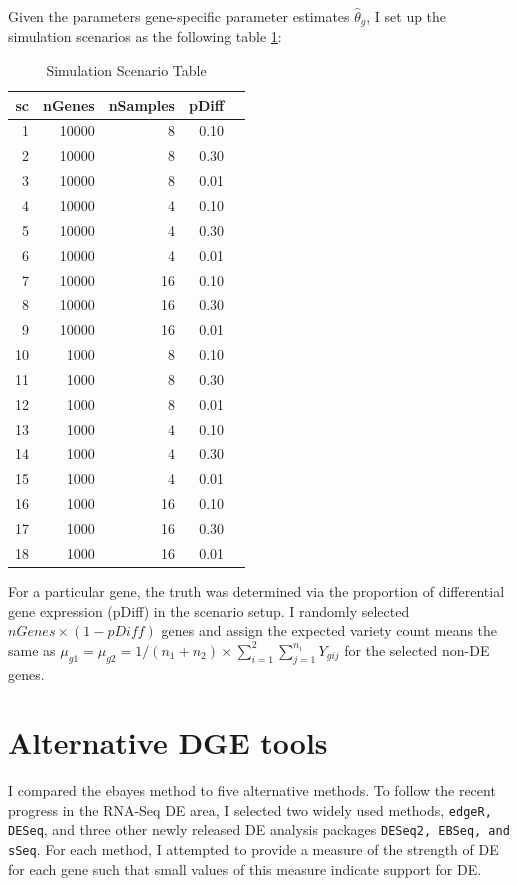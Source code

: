 \documentclass[11pt]{isuthesis}
\begin{document}
Given the parameters gene-specific parameter estimates $\hat{\theta}_g$, I set up the simulation scenarios as the following table \ref{tab:Scenario}:

\begin{table}[H]
\centering
\begin{tabular}{|r|r|r|r|r|}
\hline
sc & nGenes & nSamples & pDiff \\ 
\hline
1 & 10000 & 8 & 0.10 \\ 
\hline
2 & 10000 & 8 & 0.30 \\ 
\hline
3 & 10000 & 8 & 0.01 \\
\hline
4 & 10000 & 4 & 0.10 \\
\hline
5 & 10000 & 4 & 0.30 \\
\hline
6 & 10000 & 4 & 0.01 \\ 
\hline
7 & 10000 & 16 & 0.10 \\
\hline
8 & 10000 & 16 & 0.30 \\ 
\hline
9 & 10000 & 16 & 0.01 \\
\hline
10& 1000 & 8 & 0.10 \\
\hline
11 & 1000 & 8 & 0.30 \\
\hline
12 & 1000 & 8 & 0.01 \\ 
\hline
13 & 1000 & 4 & 0.10 \\
\hline
14 & 1000 & 4 & 0.30 \\
\hline
15 & 1000 & 4 & 0.01 \\ 
\hline
16 & 1000 & 16 & 0.10 \\
\hline
17 & 1000 & 16 & 0.30 \\ 
\hline
18 & 1000 & 16 & 0.01 \\ 
\hline
\end{tabular}
\caption{Simulation Scenario Table}
\label{tab:Scenario}
\end{table}

For a particular gene, the truth was determined via the proportion of differential gene expression (pDiff) in the scenario setup. I randomly selected $nGenes \times (1-pDiff)$ genes and assign the expected variety count means the same as $\mu_{g1} = \mu_{g2} = 1/(n_1+n_2)\times \sum_{i=1}^2 \sum_{j=1}^{n_i} Y_{gij}$ for the selected non-DE genes. 



\section{Alternative DGE tools}

I compared the ebayes method to five alternative methods. To follow the recent progress in the RNA-Seq DE area, I selected two widely used methods, {\tt edgeR, DESeq}, and three other newly released DE analysis packages {\tt DESeq2, EBSeq, and sSeq}. For each method, I attempted to provide a measure of the strength of DE for each gene such that small values of this measure indicate support for DE. 
\end{document}
